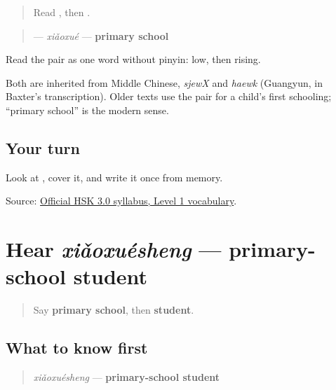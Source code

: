 \label{lesson:ZH-C14-xiaoxue}



\begin{quote}
Read , then .
\end{quote}

\begin{cousinweb}
\begin{quote}
\textbf{} — \emph{xiǎoxué} — \textbf{primary school}
\end{quote}

Read the pair as one word without pinyin: low, then rising.

Both are inherited from Middle Chinese, \emph{sjewX} and \emph{haewk} (Guangyun, in Baxter's transcription). Older texts use the pair for a child's first schooling; \textquotedblleft{}primary school\textquotedblright{} is the modern sense.
\end{cousinweb}

\subsection*{Your turn}
Look at \textbf{}, cover it, and write it once from memory.

\begin{tcolorbox}[breakable,colback=teal!4,colframe=teal!35!black,title={Before you move on}]
Source: \href{https://hsk.cn-bj.ufileos.com/3.0/\%E6\%96\%B0\%E7\%89\%88HSK\%E8\%80\%83\%E8\%AF\%95\%E5\%A4\%A7\%E7\%BA\%B21219.pdf}{Official HSK 3.0 syllabus, Level 1 vocabulary}.
\end{tcolorbox}
\section[xiǎoxuésheng]{Hear \emph{xiǎoxuésheng} — primary-school student}

\label{lesson:ZH-C14-hear-xiaoxuesheng}



\begin{quote}
Say \textbf{primary school}, then \textbf{student}.
\end{quote}

\subsection*{What to know first}
\begin{quote}
\emph{xiǎoxuésheng} — \textbf{primary-school student}
\end{quote}

